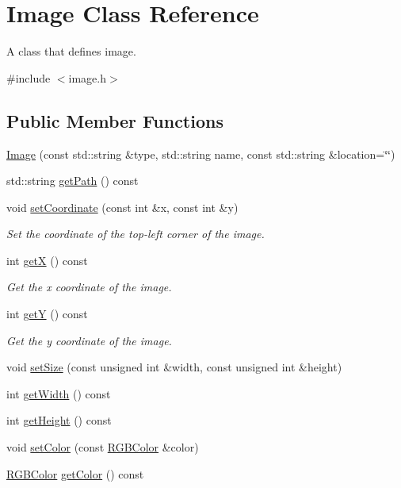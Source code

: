 \hypertarget{class_image}{}\section{Image Class Reference}
\label{class_image}


A class that defines image.  




{\ttfamily \#include $<$image.\+h$>$}

\subsection*{Public Member Functions}
\begin{DoxyCompactItemize}
\item 
\mbox{\hyperlink{class_image_a756ad99e518df8f5bd5c01e564605fa9}{Image}} (const std\+::string \&type, std\+::string name, const std\+::string \&location=\char`\"{}\char`\"{})
\item 
std\+::string \mbox{\hyperlink{class_image_a1be7f4ed8dae0ce591ac395484ab6fdb}{get\+Path}} () const
\item 
void \mbox{\hyperlink{class_image_a6ad9872152db648945187482768ac590}{set\+Coordinate}} (const int \&x, const int \&y)
\begin{DoxyCompactList}\small\item\em Set the coordinate of the top-\/left corner of the image. \end{DoxyCompactList}\item 
int \mbox{\hyperlink{class_image_ab48c8233ee01eddacd19aa943a0a6ddc}{getX}} () const
\begin{DoxyCompactList}\small\item\em Get the x coordinate of the image. \end{DoxyCompactList}\item 
int \mbox{\hyperlink{class_image_a82a57f3d6ce6cef4a07bb9d4e4903ba0}{getY}} () const
\begin{DoxyCompactList}\small\item\em Get the y coordinate of the image. \end{DoxyCompactList}\item 
void \mbox{\hyperlink{class_image_a9e801a7da9c0a032f767dbc362757349}{set\+Size}} (const unsigned int \&width, const unsigned int \&height)
\item 
int \mbox{\hyperlink{class_image_a36bcae4838228d574738249a87dc4464}{get\+Width}} () const
\item 
int \mbox{\hyperlink{class_image_a1cd7587f88b6932b5269051d1ba08ff9}{get\+Height}} () const
\item 
void \mbox{\hyperlink{class_image_a642f5f8c346c881c7d7cbbd2eb3de7ca}{set\+Color}} (const \mbox{\hyperlink{class_r_g_b_color}{R\+G\+B\+Color}} \&color)
\item 
\mbox{\hyperlink{class_r_g_b_color}{R\+G\+B\+Color}} \mbox{\hyperlink{class_image_aec79ea5d2bc5177e1c7ad43fdc19feca}{get\+Color}} () const
\end{DoxyCompactItemize}


